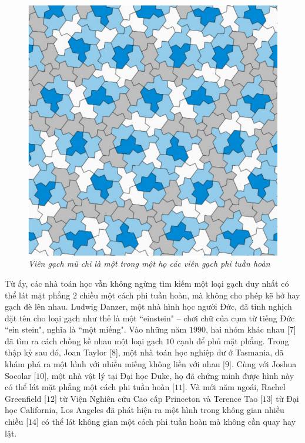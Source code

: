 \begin{multicols}{2}
	\begin{figure}[H]
		\vspace*{-5pt}
		\centering
		\captionsetup{labelformat= empty, justification=centering}
		\includegraphics[width= 1\linewidth]{1}
		\caption{\small\textit{\color{duongvaotoanhoc}Viên gạch mũ chỉ là một trong một họ các viên gạch phi tuần hoàn}}
		\vspace*{-10pt}
	\end{figure}
	Từ ấy, các nhà toán học vẫn không ngừng tìm kiếm một loại gạch duy nhất có thể lát mặt phẳng $2$ chiều một cách phi tuần hoàn, mà không cho phép kẽ hở hay gạch đè lên nhau. Ludwig Danzer, một nhà hình học người Đức, đã tinh nghịch đặt tên cho loại gạch như thế là một ``einstein" -- chơi chữ của cụm từ tiếng Đức ``ein stein", nghĩa là ``một miếng".
	\vskip 0.1cm
	Vào những năm $1990$, hai nhóm khác nhau  [$7$] đã tìm ra cách chồng kề nhau một loại gạch $10$ cạnh để phủ mặt phẳng. Trong thập kỷ sau đó, Joan Taylor [$8$], một nhà toán học nghiệp dư ở Tasmania, đã khám phá ra một hình với nhiều miếng không liền  với nhau  [$9$]. Cùng với Joshua Socolar [$10$], một nhà vật lý tại Đại học Duke, họ đã chứng minh được hình này có thể lát mặt phẳng một cách phi tuần hoàn  [$11$]. Và mới năm ngoái, Rachel Greenfield [$12$] từ Viện Nghiên cứu Cao cấp Princeton và Terence Tao [$13$] từ Đại học California, Los Angeles đã phát hiện ra một hình trong không gian nhiều chiều [$14$] có thể lát không gian một cách phi tuần hoàn mà không cần quay hay lật.

\end{multicols}
